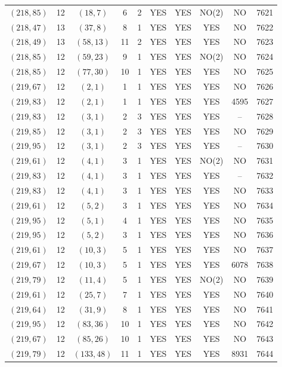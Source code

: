 \begin{longtable}{|c|c|c|c|c|c|c|c|c|c|}
$(218, 85)$ & 12 & $(18, 7)$ & 6 & 2 & YES & YES & NO(2) & NO & 7621\\
$(218, 47)$ & 13 & $(37, 8)$ & 8 & 1 & YES & YES & YES & NO & 7622\\
$(218, 49)$ & 13 & $(58, 13)$ & 11 & 2 & YES & YES & YES & NO & 7623\\
$(218, 85)$ & 12 & $(59, 23)$ & 9 & 1 & YES & YES & NO(2) & NO & 7624\\
$(218, 85)$ & 12 & $(77, 30)$ & 10 & 1 & YES & YES & YES & NO & 7625\\
$(219, 67)$ & 12 & $(2, 1)$ & 1 & 1 & YES & YES & YES & NO & 7626\\
$(219, 83)$ & 12 & $(2, 1)$ & 1 & 1 & YES & YES & YES & 4595 & 7627\\
$(219, 83)$ & 12 & $(3, 1)$ & 2 & 3 & YES & YES & YES & -- & 7628\\
$(219, 85)$ & 12 & $(3, 1)$ & 2 & 3 & YES & YES & YES & NO & 7629\\
$(219, 95)$ & 12 & $(3, 1)$ & 2 & 3 & YES & YES & YES & -- & 7630\\
$(219, 61)$ & 12 & $(4, 1)$ & 3 & 1 & YES & YES & NO(2) & NO & 7631\\
$(219, 83)$ & 12 & $(4, 1)$ & 3 & 1 & YES & YES & YES & -- & 7632\\
$(219, 83)$ & 12 & $(4, 1)$ & 3 & 1 & YES & YES & YES & NO & 7633\\
$(219, 61)$ & 12 & $(5, 2)$ & 3 & 1 & YES & YES & YES & NO & 7634\\
$(219, 95)$ & 12 & $(5, 1)$ & 4 & 1 & YES & YES & YES & NO & 7635\\
$(219, 95)$ & 12 & $(5, 2)$ & 3 & 1 & YES & YES & YES & NO & 7636\\
$(219, 61)$ & 12 & $(10, 3)$ & 5 & 1 & YES & YES & YES & NO & 7637\\
$(219, 67)$ & 12 & $(10, 3)$ & 5 & 1 & YES & YES & YES & 6078 & 7638\\
$(219, 79)$ & 12 & $(11, 4)$ & 5 & 1 & YES & YES & NO(2) & NO & 7639\\
$(219, 61)$ & 12 & $(25, 7)$ & 7 & 1 & YES & YES & YES & NO & 7640\\
$(219, 64)$ & 12 & $(31, 9)$ & 8 & 1 & YES & YES & YES & NO & 7641\\
$(219, 95)$ & 12 & $(83, 36)$ & 10 & 1 & YES & YES & YES & NO & 7642\\
$(219, 67)$ & 12 & $(85, 26)$ & 10 & 1 & YES & YES & YES & NO & 7643\\
$(219, 79)$ & 12 & $(133, 48)$ & 11 & 1 & YES & YES & YES & 8931 & 7644\\

\end{longtable}
